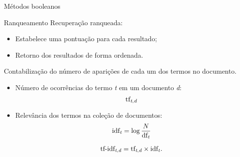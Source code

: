 \documentclass[%
  10pt,%
  aspectratio = 169,%
  compress,%
  t,%
]{beamer}%
\begin{document}
    \begin{frame}[fragile = singleslide]{}{Métodos booleanos}
        
    \end{frame}

    \begin{frame}[fragile = singleslide]{}{Ranqueamento}
        Recuperação ranqueada:
        \begin{itemize}
            \item Estabelece uma pontuação para cada resultado;
            \item Retorno dos resultados de forma ordenada.
        \end{itemize}

        Contabilização do número de aparições de cada um dos termos no documento.
        \begin{itemize}
            \item Número de ocorrências do termo \textit{t} em um documento \textit{d}:
            \begin{equation}\label{eq:tf-td}
                \text{tf}_{\text{\textit{t},\textit{d}}}
            \end{equation}
            \item Relevância dos termos na coleção de documentos:
            \begin{equation}
                \label{eq:inverse-document-frequency}
                \text{idf}_{\text{\textit{t}}} = \log{\frac{N}{\text{df}_{\text{\textit{t}}}}}
            \end{equation}

            \begin{equation}
                \label{eq:tf-idf}
                \text{tf-idf}_{\text{\textit{t},\textit{d}}}  = \text{tf}_{\text{\textit{t},\textit{d}}} \times \text{idf}_{\text{\textit{t}}}.
            \end{equation}
        \end{itemize}

    \end{frame}
\end{document}
